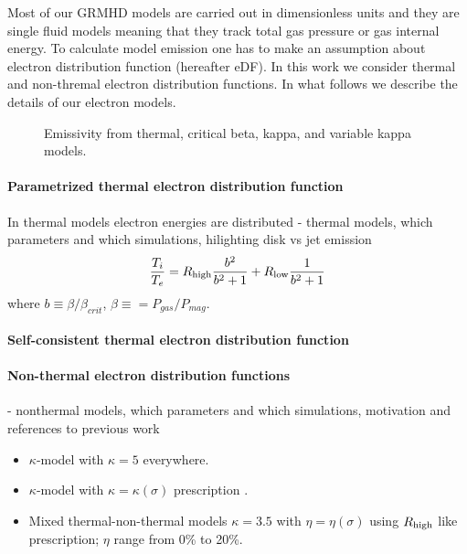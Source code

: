 Most of our GRMHD models are carried out in dimensionless units and
they are single fluid models meaning that they track total gas
pressure or gas internal energy. To calculate model emission one has
to make an assumption about electron distribution function (hereafter
eDF). In this work we consider thermal and non-thremal electron
distribution functions. In what follows we describe the details of our
electron models.

\begin{figure*}
  \caption{Emissivity from thermal, critical beta, kappa, and variable
    kappa models.}
  \label{fig:jnu}
\end{figure*}

\paragraph{Parametrized thermal electron distribution function}
In thermal models electron energies are distributed
- thermal models, which parameters and which simulations, hilighting disk vs jet emission
\begin{equation}
\frac{T_i}{T_e} = R_{\rm high} \frac{b^2}{b^2+1} + R_{\rm low} \frac{1}{b^2+1}
\end{equation}
where $b\equiv\beta/\beta_{crit}$, $\beta\equiv=P_{gas}/P_{mag}$.

\paragraph{Self-consistent thermal electron distribution function}

\paragraph{Non-thermal electron distribution functions}
- nonthermal models, which parameters and which simulations, motivation and references to previous work

\begin{itemize}
\item $\kappa$-model with $\kappa = 5$ everywhere.
\item $\kappa$-model with $\kappa = \kappa(\sigma)$ prescription
  \citep{2016ApJ...826...77B}.
\item Mixed thermal-non-thermal models $\kappa = 3.5$ with $\eta =
  \eta(\sigma)$ using $R_\mathrm{high}$ like prescription; $\eta$ range from 0\%
  to 20\%.
\end{itemize}

